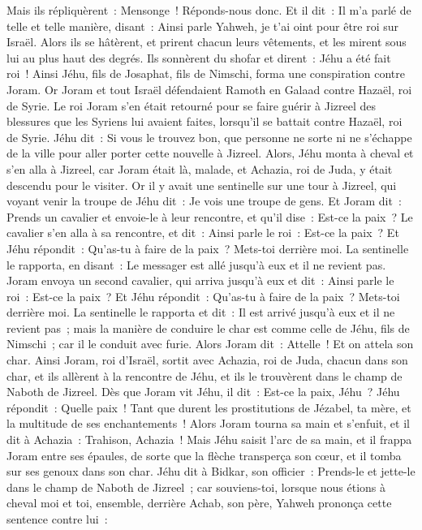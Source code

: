 \begin{multicols}{2}
Mais ils répliquèrent~: Mensonge~! Réponds-nous donc. Et il dit~: Il m'a parlé de telle et telle manière, disant~: Ainsi parle Yahweh, je t'ai oint pour être roi sur Israël.
Alors ils se hâtèrent, et prirent chacun leurs vêtements, et les mirent sous lui au plus haut des degrés. Ils sonnèrent du shofar et dirent~: Jéhu a été fait roi~!
Ainsi Jéhu, fils de Josaphat, fils de Nimschi, forma une conspiration contre Joram. Or Joram et tout Israël défendaient Ramoth en Galaad contre Hazaël, roi de Syrie.
Le roi Joram s'en était retourné pour se faire guérir à Jizreel des blessures que les Syriens lui avaient faites, lorsqu'il se battait contre Hazaël, roi de Syrie. Jéhu dit~: Si vous le trouvez bon, que personne ne sorte ni ne s'échappe de la ville pour aller porter cette nouvelle à Jizreel.
Alors, Jéhu monta à cheval et s'en alla à Jizreel, car Joram était là, malade, et Achazia, roi de Juda, y était descendu pour le visiter.
Or il y avait une sentinelle sur une tour à Jizreel, qui voyant venir la troupe de Jéhu dit~: Je vois une troupe de gens. Et Joram dit~: Prends un cavalier et envoie-le à leur rencontre, et qu'il dise~: Est-ce la paix~?
Le cavalier s'en alla à sa rencontre, et dit~: Ainsi parle le roi~: Est-ce la paix~? Et Jéhu répondit~: Qu'as-tu à faire de la paix~? Mets-toi derrière moi. La sentinelle le rapporta, en disant~: Le messager est allé jusqu'à eux et il ne revient pas.
Joram envoya un second cavalier, qui arriva jusqu'à eux et dit~: Ainsi parle le roi~: Est-ce la paix~? Et Jéhu répondit~: Qu'as-tu à faire de la paix~? Mets-toi derrière moi.
La sentinelle le rapporta et dit~: Il est arrivé jusqu'à eux et il ne revient pas~; mais la manière de conduire le char est comme celle de Jéhu, fils de Nimschi~; car il le conduit avec furie.
Alors Joram dit~: Attelle~! Et on attela son char. Ainsi Joram, roi d'Israël, sortit avec Achazia, roi de Juda, chacun dans son char, et ils allèrent à la rencontre de Jéhu, et ils le trouvèrent dans le champ de Naboth de Jizreel.
Dès que Joram vit Jéhu, il dit~: Est-ce la paix, Jéhu~? Jéhu répondit~: Quelle paix~! Tant que durent les prostitutions de Jézabel, ta mère, et la multitude de ses enchantements~!
Alors Joram tourna sa main et s'enfuit, et il dit à Achazia~: Trahison, Achazia~!
Mais Jéhu saisit l'arc de sa main, et il frappa Joram entre ses épaules, de sorte que la flèche transperça son cœur, et il tomba sur ses genoux dans son char.
Jéhu dit à Bidkar, son officier~: Prends-le et jette-le dans le champ de Naboth de Jizreel~; car souviens-toi, lorsque nous étions à cheval moi et toi, ensemble, derrière Achab, son père, Yahweh prononça cette sentence contre lui~:

\end{multicols}
